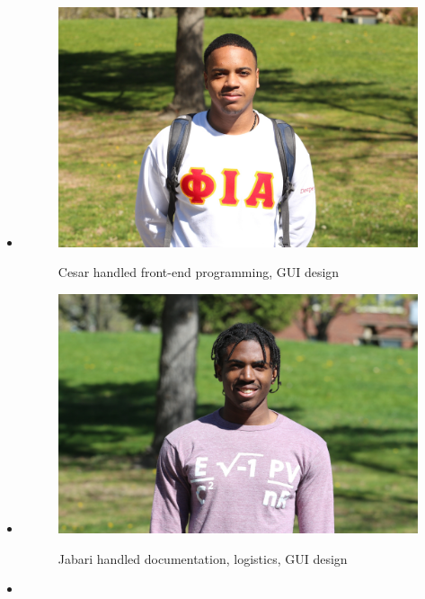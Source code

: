 \documentclass{article}
\begin{document}
		\begin{minipage}{0.45\textwidth}
			\begin{itemize}[label={}]
				\item
  					\begin{figure}[H]
  						\includegraphics[scale=.07]{cesar.jpg}\\
  							\captionsetup{labelformat=empty}
  							\caption{Cesar handled front-end programming, GUI design}
  					\end{figure}
  				\item
  					\begin{figure}[H]
  						\includegraphics[scale=.07]{jabari.jpg}\\
  							\captionsetup{labelformat=empty}
  							\caption{Jabari handled documentation, logistics, GUI design}
  					\end{figure}
  				\item

\end{itemize}
\end{minipage}
\end{document}
